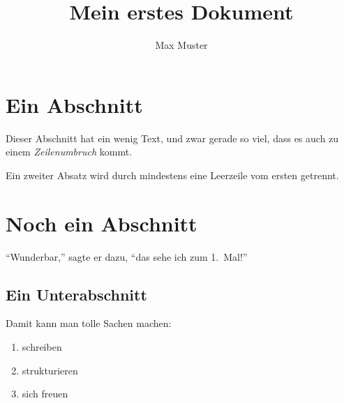 \documentclass[a4paper]{scrartcl}
\begin{document}
\author{Max Muster}
\title{Mein erstes Dokument}
\maketitle
\tableofcontents

\section{Ein Abschnitt}
Dieser Abschnitt hat ein wenig Text, und zwar gerade so viel, dass
es auch zu einem \emph{Zeilenumbruch} kommt. 

Ein zweiter Absatz wird durch mindestens eine Leerzeile vom ersten
getrennt.

\section{Noch ein Abschnitt}
"`Wunderbar,"' sagte er dazu, "`das sehe ich zum 1.~Mal!"'

\subsection{Ein Unterabschnitt}
Damit kann man tolle Sachen machen:

\begin{enumerate}
\item schreiben
\item strukturieren
\item sich freuen
\end{enumerate}
\end{document}
